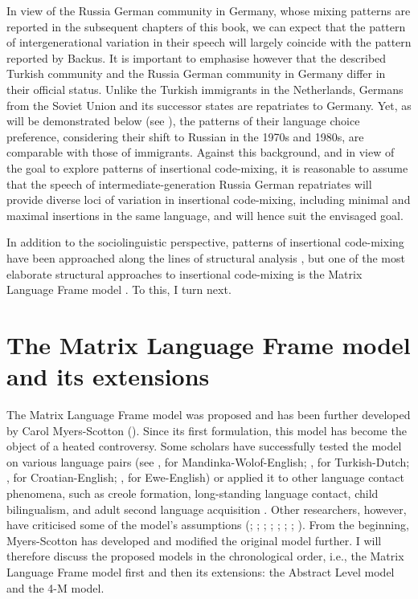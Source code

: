 In view of the Russia German community in Germany, whose mixing patterns are reported in the subsequent chapters of this book, we can expect that the pattern of intergenerational variation in their speech will largely coincide with the pattern reported by Backus. It is important to emphasise however that the described Turkish community and the Russia German community in Germany differ in their official status. Unlike the Turkish immigrants in the Netherlands, Germans from the Soviet Union and its successor states are repatriates to Germany. Yet, as will be demonstrated below (see ), the patterns of their language choice preference, considering their shift to Russian in the 1970s and 1980s, are comparable with those of immigrants. Against this background, and in view of the goal to explore patterns of insertional code-mixing, it is reasonable to assume that the speech of intermediate-generation Russia German repatriates will provide diverse loci of variation in insertional code-mixing, including minimal and maximal insertions in the same language, and will hence suit the envisaged goal.

In addition to the sociolinguistic perspective, patterns of insertional code-mixing have been approached along the lines of structural analysis \citep[e.g.,][]{halmari-government-1997,boumans-syntax-1998,verschik08}, but one of the most elaborate structural approaches to insertional code-mixing is the Matrix Language Frame model \citep[cf.][363]{muysken-code-switching-1997}. To this, I turn next.

\section{The Matrix Language Frame model and its extensions}{\label{MLF}}
The Matrix Language Frame model was proposed and has been further developed by Carol Myers-Scotton  (\citeyear{myers-scotton-duelling-1993,myers-scotton-contact-2002}). Since its first formulation, this model has become the object of a heated controversy. Some scholars have successfully tested the model on various language pairs (see \citealt[]{haust-codeswitching-1995}, for Mandinka-Wolof-English;  \citealt[]{backus-two-1996}, for Turkish-Dutch;  \citealt[]{hlavac-second-generation-2003}, for Croatian-English;
\citealt[][]{amuzu-composite-2010}, for Ewe-English) or applied it to other language contact phenomena, such as creole formation, long-standing language contact, child bilingualism, and adult second language acquisition \citep[cf.][]{myers-scotton-testing-2000}. Other researchers, however, have criticised some of the model's assumptions (\citealt{meechan-orphan-1995}; \citealt{halmari-government-1997};   \citealt{jacobson-codeswitching-1998};  \citealt{boumans-syntax-1998}; \citealt{auer-embedded-2005};  \citealt{muhamedowa-untersuchung-2006};  \citealt{bullock-toribio-chang};  \citealt{zabrodskaja-evaluating-2009}). From the beginning, Myers-Scotton has developed and modified the original model further. I will therefore discuss the proposed models in the chronological order, i.e., the Matrix Language Frame model first and then its extensions: the Abstract Level model and the 4-M model.

